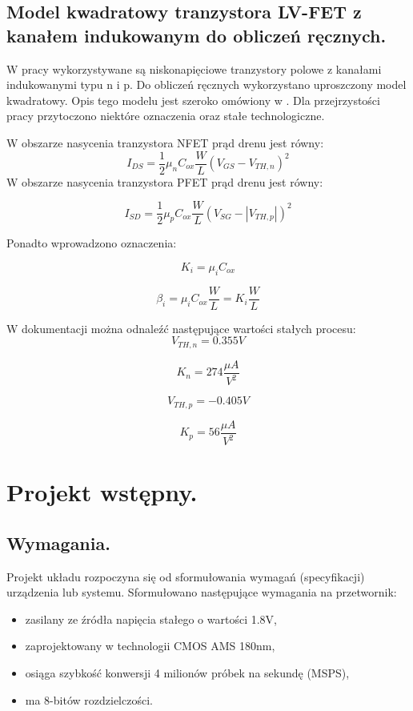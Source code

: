 \documentclass[10pt,a4paper]{report}
\theoremstyle{definition}
\theoremstyle{definition}
\theoremstyle{definition}
\theoremstyle{definition}
\theoremstyle{definition}
\begin{document}
	\section{Model kwadratowy tranzystora LV-FET z kanałem indukowanym do obliczeń ręcznych.}
	{ 	W pracy wykorzystywane są niskonapięciowe tranzystory polowe z kanałami indukowanymi typu n i p. Do obliczeń ręcznych wykorzystano uproszczony model kwadratowy. Opis tego modelu jest szeroko omówiony w \cite{cmosanal}. Dla przejrzystości pracy przytoczono niektóre oznaczenia oraz stałe technologiczne. }
	{	W obszarze nasycenia tranzystora NFET prąd drenu jest równy:
		\begin{equation}
			I_{DS} = \frac{1}{2} \mu_n C_{ox} \frac{W}{L} \left( V_{GS} - V_{TH,n} \right)^2
		\end{equation}	
		W obszarze nasycenia tranzystora PFET prąd drenu jest równy:
	
		\begin{equation}
		I_{SD} = \frac{1}{2} \mu_p C_{ox} \frac{W}{L} \left( V_{SG} - \left|V_{TH,p}\right| \right)^2
		\end{equation}	
	}

	{	Ponadto wprowadzono oznaczenia:
	
		$$
			K_i = \mu_i C_{ox}
		$$
	
		$$
			\beta_i = \mu_i C_{ox} \frac{W}{L} = K_i \frac{W}{L}
		$$
	}

	{	W dokumentacji można odnaleźć następujące wartości stałych procesu:
		$$
			V_{TH,n} = 0.355V
		$$
		
		$$
			K_n = 274 \frac{\mu A}{V^2}
		$$

		$$
			V_{TH,p} = -0.405V
		$$
	
		$$
			K_p = 56 \frac{\mu A}{V^2}
		$$	
	}

	\chapter{Projekt wstępny.}

	\section{Wymagania.}
	{	Projekt układu rozpoczyna się od sformułowania wymagań (specyfikacji) urządzenia lub systemu. Sformułowano następujące wymagania na przetwornik:
		\begin{itemize}
			\item zasilany ze źródła napięcia stałego o wartości 1.8V,
			\item zaprojektowany w technologii CMOS AMS 180nm,
			\item osiąga szybkość konwersji 4 milionów próbek na sekundę (MSPS),
			\item ma 8-bitów rozdzielczości.
	\end{itemize} }
\end{document}
